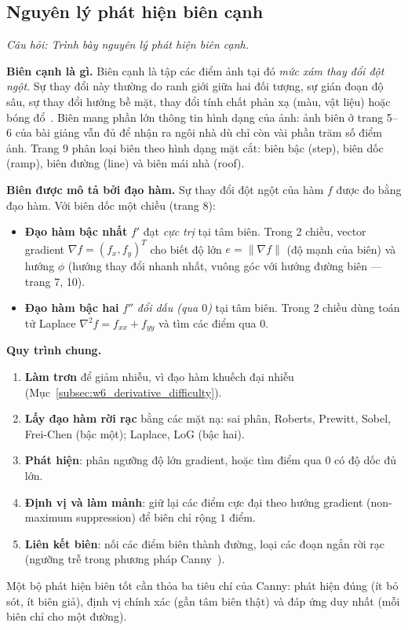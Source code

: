 \subsection{Nguyên lý phát hiện biên cạnh}
\label{subsec:w6_edge_principle}

\textit{Câu hỏi: Trình bày nguyên lý phát hiện biên cạnh.}

\textbf{Biên cạnh là gì.} Biên cạnh là tập các điểm ảnh tại đó \emph{mức xám thay đổi đột ngột}. Sự thay đổi này thường do ranh giới giữa hai đối tượng, sự gián đoạn độ sâu, sự thay đổi hướng bề mặt, thay đổi tính chất phản xạ (màu, vật liệu) hoặc bóng đổ~\citep{xlav_lec6}. Biên mang phần lớn thông tin hình dạng của ảnh: ảnh biên ở trang 5--6 của bài giảng vẫn đủ để nhận ra ngôi nhà dù chỉ còn vài phần trăm số điểm ảnh. Trang 9 phân loại biên theo hình dạng mặt cắt: biên bậc (step), biên dốc (ramp), biên đường (line) và biên mái nhà (roof).

\textbf{Biên được mô tả bởi đạo hàm.} Sự thay đổi đột ngột của hàm $f$ được đo bằng đạo hàm. Với biên dốc một chiều (trang 8):
\begin{itemize}
    \item \textbf{Đạo hàm bậc nhất} $f'$ đạt \emph{cực trị} tại tâm biên. Trong 2 chiều, vector gradient $\nabla f = (f_x, f_y)^T$ cho biết độ lớn $e = \|\nabla f\|$ (độ mạnh của biên) và hướng $\phi$ (hướng thay đổi nhanh nhất, vuông góc với hướng đường biên — trang 7, 10).
    \item \textbf{Đạo hàm bậc hai} $f''$ \emph{đổi dấu (qua $0$)} tại tâm biên. Trong 2 chiều dùng toán tử Laplace $\nabla^2 f = f_{xx} + f_{yy}$ và tìm các điểm qua $0$.
\end{itemize}

\textbf{Quy trình chung.}
\begin{enumerate}
    \item \textbf{Làm trơn} để giảm nhiễu, vì đạo hàm khuếch đại nhiễu (Mục~\ref{subsec:w6_derivative_difficulty}).
    \item \textbf{Lấy đạo hàm rời rạc} bằng các mặt nạ: sai phân, Roberts, Prewitt, Sobel, Frei-Chen (bậc một); Laplace, LoG (bậc hai).
    \item \textbf{Phát hiện}: phân ngưỡng độ lớn gradient, hoặc tìm điểm qua $0$ có độ dốc đủ lớn.
    \item \textbf{Định vị và làm mảnh}: giữ lại các điểm cực đại theo hướng gradient (non-maximum suppression) để biên chỉ rộng $1$ điểm.
    \item \textbf{Liên kết biên}: nối các điểm biên thành đường, loại các đoạn ngắn rời rạc (ngưỡng trễ trong phương pháp Canny~\citep{canny1986computational}).
\end{enumerate}
Một bộ phát hiện biên tốt cần thỏa ba tiêu chí của Canny: phát hiện đúng (ít bỏ sót, ít biên giả), định vị chính xác (gần tâm biên thật) và đáp ứng duy nhất (mỗi biên chỉ cho một đường).

